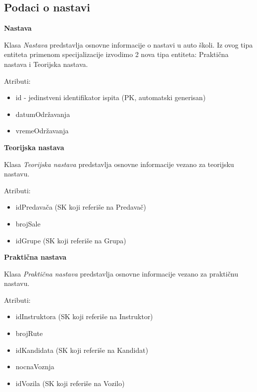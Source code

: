 \subsection{Podaci o nastavi}

\textbf{\large Nastava}
\vspace{0.3cm}

Klasa \textit{Nastava} predstavlja osnovne informacije o nastavi u auto školi. Iz ovog tipa entiteta primenom specijalizacije izvodimo 2 nova tipa entiteta: Praktična nastava i Teorijska nastava.

Atributi:
\begin{itemize}
    \item id - jedinstveni identifikator ispita (PK, automatski generisan)
    \item datumOdržavanja
    \item vremeOdržavanja
\end{itemize}

\textbf{\large Teorijska nastava}
\vspace{0.3cm}

Klasa \textit{Teorijska nastava} predstavlja osnovne informacije vezano za teorijsku nastavu.

Atributi:
\begin{itemize}
    \item idPredavača (SK koji referiše na Predavač)
    \item brojSale
    \item idGrupe (SK koji referiše na Grupa)
\end{itemize}

\textbf{\large Praktična nastava}
\vspace{0.3cm}

Klasa \textit{Praktična nastava} predstavlja osnovne informacije vezano za praktičnu nastavu.

Atributi:
\begin{itemize}
    \item idInstruktora (SK koji referiše na Instruktor)
    \item brojRute
    \item idKandidata (SK koji referiše na Kandidat)
    \item nocnaVoznja
    \item idVozila (SK koji referiše na Vozilo)
\end{itemize}

